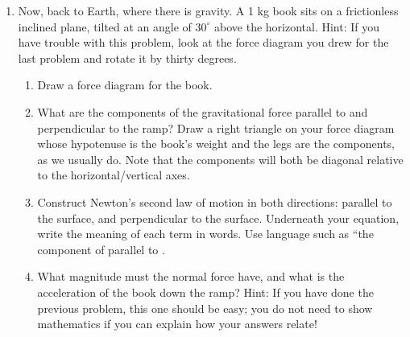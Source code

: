 \documentclass[12pt]{article}
\begin{document}
\begin{enumerate}
\item{Now, back to Earth, where there is gravity. A 1 kg book sits on a frictionless inclined
 	plane, tilted at an angle of $30^\circ$ above the horizontal. Hint: If you have trouble with
 	this problem, look at the force diagram you drew for the last problem and rotate it by
 	thirty degrees. }
\begin{enumerate}
\item{Draw a force diagram for the book. }
\item{What are the components of the gravitational force parallel to and perpendicular
 	to the ramp? Draw a right triangle on your force diagram whose hypotenuse is
 	the book’s weight and the legs are the components, as we usually do. Note that
 	the components will both be diagonal relative to the horizontal/vertical axes. }
\item Construct Newton's second law of motion in both directions: parallel to the surface, and perpendicular to the surface. 
Underneath your equation, write the meaning of each term in words. Use language such as ``the component of \underline{\hspace{0.5in}} parallel to \underline{\hspace{0.5in}}.
\item{What magnitude must the normal force have, and what is the acceleration of the book down the ramp? Hint: If you have done the
 	previous problem, this one should be easy; you do not need to show mathematics
 	if you can explain how your answers relate!}
\end{enumerate}
 


\end{enumerate}
\end{document}
